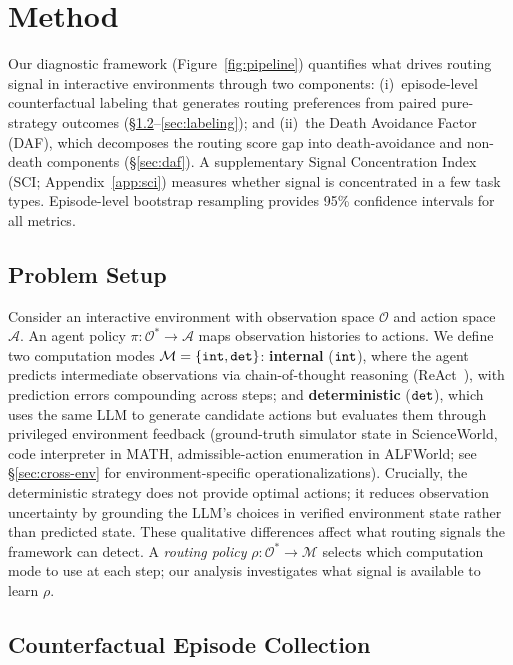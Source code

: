 \section{Method}
\label{sec:method}

Our diagnostic framework (Figure~\ref{fig:pipeline}) quantifies what drives routing signal in interactive environments through two components: (i)~episode-level counterfactual labeling that generates routing preferences from paired pure-strategy outcomes (\S\ref{sec:collection}--\ref{sec:labeling}); and (ii)~the Death Avoidance Factor (DAF), which decomposes the routing score gap into death-avoidance and non-death components (\S\ref{sec:daf}). A supplementary Signal Concentration Index (SCI; Appendix~\ref{app:sci}) measures whether signal is concentrated in a few task types. Episode-level bootstrap resampling provides 95\% confidence intervals for all metrics.

\subsection{Problem Setup}
\label{sec:problem-setup}

Consider an interactive environment with observation space $\mathcal{O}$ and action space $\mathcal{A}$. An agent policy $\pi: \mathcal{O}^* \rightarrow \mathcal{A}$ maps observation histories to actions. We define two computation modes $\mathcal{M} = \{{\tt int}, {\tt det}\}$: \textbf{internal} (${\tt int}$), where the agent predicts intermediate observations via chain-of-thought reasoning (ReAct~\citep{react-2023}), with prediction errors compounding across steps; and \textbf{deterministic} (${\tt det}$), which uses the same LLM to generate candidate actions but evaluates them through privileged environment feedback (ground-truth simulator state in ScienceWorld, code interpreter in MATH, admissible-action enumeration in ALFWorld; see \S\ref{sec:cross-env} for environment-specific operationalizations). Crucially, the deterministic strategy does not provide optimal actions; it reduces observation uncertainty by grounding the LLM's choices in verified environment state rather than predicted state. These qualitative differences affect what routing signals the framework can detect. A \emph{routing policy} $\rho: \mathcal{O}^* \rightarrow \mathcal{M}$ selects which computation mode to use at each step; our analysis investigates what signal is available to learn $\rho$.

\subsection{Counterfactual Episode Collection}
\label{sec:collection}


